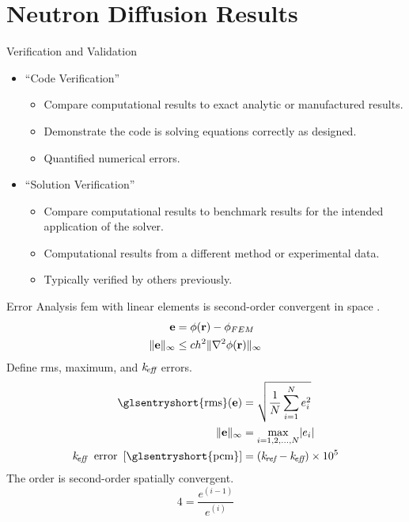 \section{Neutron Diffusion Results}
\label{sec:diffusionResults}

\begin{frame}{Verification and Validation}
  \begin{itemize}
    \item ``Code Verification''
      \begin{itemize}
        \item Compare computational results to exact analytic or manufactured
          results.
        \item Demonstrate the code is solving equations correctly as designed.
        \item Quantified numerical errors.
      \end{itemize}
    \item ``Solution Verification''
      \begin{itemize}
        \item Compare computational results to benchmark results for the
          intended application of the solver.
        \item Computational results from a different method or experimental
          data.
        \item Typically verified by others previously.
      \end{itemize}
  \end{itemize}
\end{frame}

\begin{frame}{Error Analysis}
  \gls{fem} with linear elements is second-order convergent in space
  \cite{textbookli}.
  \begin{align} 
    \label{eq:error_bound}
    \mathbf{e} &= \phi(\mathbf{r}) - \phi_{FEM} \\
    \|\mathbf{e}\|_{\infty} &\le c h^2 \| \mathbf{\nabla}^2 \phi(\mathbf{r}) \|_{\infty}
  \end{align}
  Define \gls{rms}, maximum, and $k_{\!\mbox{\scriptsize \em eff}}$ errors.
  \begin{align}
    \label{eq:rms}
    \text{\glsentryshort{rms}}(\ve) &= \sqrt{\frac{1}{N} \sum_{i=1}^{N} e_i^2}\\
    \label{eq:infnorm}
    \|\ve\|_{\infty} &= \max_{i=1,2,\ldots,N} \lvert e_i \rvert \\
    \label{eq:keff_err}
    \keff \; \text{ error } \units{\glsentryshort{pcm}} &= (\kref - \keff) \times 10^5
  \end{align}
  The order is second-order spatially convergent.
  \begin{equation}
    4 = \frac{e^{(i-1)}}{e^{(i)}}
  \end{equation}
\end{frame}

